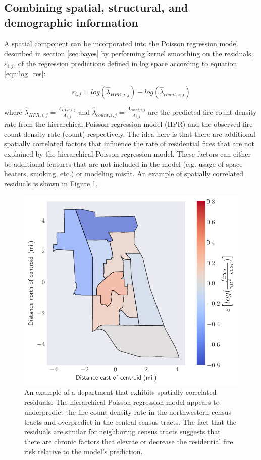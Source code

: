 \documentclass{svjour3}
\begin{document}
  \subsection{Combining spatial, structural, and demographic information} 
  A spatial component can be incorporated into the Poisson regression model described in section \ref{sec:bayes} by performing kernel smoothing on the residuals, $\varepsilon_{i,j}$, of the regression predictions defined in log space according to equation \ref{eqn:log_res}:
  
    \begin{equation}
    \label{eqn:log_res}
    \varepsilon_{i,j} = log(\hat\lambda_{HPR,i,j}) -  log(\hat\lambda_{count,i,j})
    \end{equation}

\noindent where $\hat\lambda_{HPR,i,j}=\frac{\Lambda_{HPR,i,j}}{A_{i,j}}$ and $\hat\lambda_{count,i,j}=\frac{\Lambda_{count,i,j}}{A_{i,j}}$ are the predicted fire count density rate from the hierarchical Poisson regression model (HPR) and the observed fire count density rate (count) respectively. The idea here is that there are additional spatially correlated factors that influence the rate of residential fires that are not explained by the hierarchical Poisson regression model. These factors can either be additional features that are not included in the model (e.g. usage of space heaters, smoking, etc.) or modeling misfit. An example of spatially correlated residuals is shown in Figure \ref{fig:spatialcorr}. 
  
\begin{figure}[htb] \centering
\includegraphics[width=.75\textwidth]{figures/spatial_correlation.pdf}
\caption{An example of a department that exhibits spatially correlated residuals. The hierarchical Poisson regression model appears to underpredict the fire count density rate in the northwestern census tracts and overpredict in the central census tracts. The fact that the residuals are similar for neighboring census tracts suggests that there are chronic factors that elevate or decrease the residential fire risk relative to the model's prediction.}
\label{fig:spatialcorr}
\end{figure}
\end{document}
